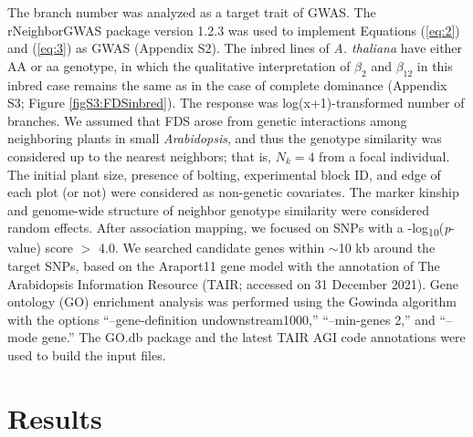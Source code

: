 \documentclass[12pt,]{article}
\begin{document}
The branch number was analyzed as a target trait of GWAS. The rNeighborGWAS package version 1.2.3 \citep{sato2019neighbor} was used to implement Equations (\ref{eq:2}) and (\ref{eq:3}) as GWAS (Appendix S2). The inbred lines of \textit{A. thaliana} have either AA or aa genotype, in which the qualitative interpretation of $\beta_2$ and $\beta_{12}$ in this inbred case remains the same as in the case of complete dominance (Appendix S3; Figure \ref{figS3:FDSinbred}). The response was log(x+1)-transformed number of branches. We assumed that FDS arose from genetic interactions among neighboring plants in small \textit{Arabidopsis}, and thus the genotype similarity was considered up to the nearest neighbors; that is, $N_k=4$ from a focal individual. The initial plant size, presence of bolting, experimental block ID, and edge of each plot (or not) were considered as non-genetic covariates. The marker kinship and genome-wide structure of neighbor genotype similarity were considered random effects. After association mapping, we focused on SNPs with a -log\textsubscript{10}(\textit{p}-value) score $>$ 4.0. We searched candidate genes within $\sim$10 kb around the target SNPs, based on the Araport11 gene model with the annotation of The Arabidopsis Information Resource (TAIR; accessed on 31 December 2021). Gene ontology (GO) enrichment analysis was performed using the Gowinda algorithm \citep{kofler2012gowinda} with the options “--gene-definition undownstream1000,” “--min-genes 2,” and “--mode gene.” The GO.db package \citep{Carlson2020GOdb} and the latest TAIR AGI code annotations were used to build the input files.


\section{Results}
\end{document}
